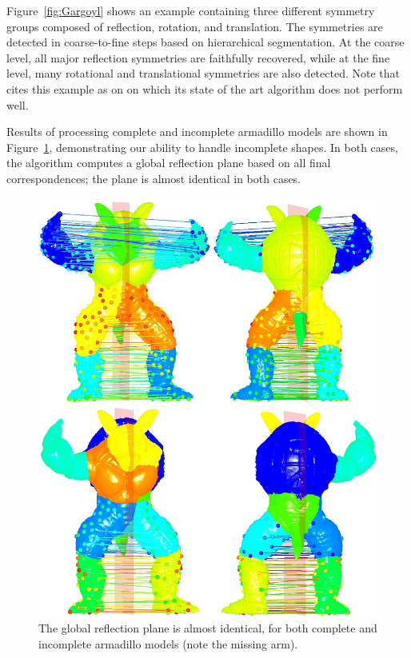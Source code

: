 Figure~\ref{fig:Gargoyl} shows an example containing three different symmetry groups composed of reflection, rotation, and translation.
The symmetries are detected in coarse-to-fine steps based on  hierarchical segmentation.
At the coarse level, all major reflection symmetries are faithfully recovered,
while at the fine level, many rotational and translational symmetries are also detected.
Note that~\cite{berner2011} cites this example as on on which its state of the art algorithm  does
not perform well.

Results of processing complete and incomplete armadillo models are shown in Figure~\ref{fig:Arm},
demonstrating our ability to handle incomplete shapes.
In both cases, the algorithm computes a global reflection plane based on all final correspondences; the plane is almost identical in  both cases.

\begin{figure}[t]
\centering
  \includegraphics[width=0.99\linewidth]{figures/Armadillo.pdf}
  \caption{The global reflection plane is almost identical, for both complete and incomplete armadillo models (note the missing arm).}
\label{fig:Arm}
\end{figure}

